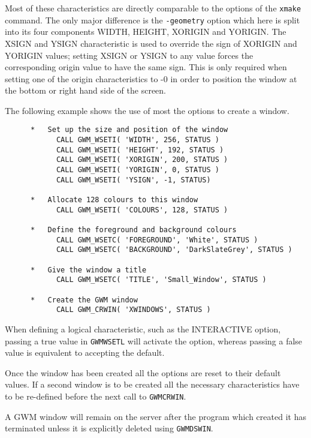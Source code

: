 \documentclass[twoside,11pt]{article}
\newcommand{\htmlref}[2]{#1}
\renewcommand{\_}{\texttt{\symbol{95}}}
\begin{document}
Most of these characteristics are directly comparable to the options
of the {\tt xmake} command. The only major difference is the
\texttt{\htmlref{-geometry}{geometryOpt}}
option which here is split into its four components WIDTH, HEIGHT, XORIGIN
and YORIGIN. The XSIGN and YSIGN characteristic is used to override the sign of
XORIGIN and YORIGIN values; setting XSIGN or YSIGN
to any value forces the corresponding origin value to have the same
sign. This is only required when setting one of the
origin characteristics to -0 in order to position the window at the
bottom or right hand side of the screen.

The following example shows the use of most the options to create a window.

\begin{small}
\begin{verbatim}
      *   Set up the size and position of the window
            CALL GWM_WSETI( 'WIDTH', 256, STATUS )
            CALL GWM_WSETI( 'HEIGHT', 192, STATUS )
            CALL GWM_WSETI( 'XORIGIN', 200, STATUS )
            CALL GWM_WSETI( 'YORIGIN', 0, STATUS )
            CALL GWM_WSETI( 'YSIGN', -1, STATUS)

      *   Allocate 128 colours to this window
            CALL GWM_WSETI( 'COLOURS', 128, STATUS )

      *   Define the foreground and background colours
            CALL GWM_WSETC( 'FOREGROUND', 'White', STATUS )
            CALL GWM_WSETC( 'BACKGROUND', 'DarkSlateGrey', STATUS )

      *   Give the window a title
            CALL GWM_WSETC( 'TITLE', 'Small_Window', STATUS )

      *   Create the GWM window
            CALL GWM_CRWIN( 'XWINDOWS', STATUS )
\end{verbatim}
\end{small}

When defining a logical characteristic, such as the INTERACTIVE option,
passing a true value in \texttt{\htmlref{GWM\_WSETL}{GWM_WSETL}}
will activate the option,
whereas passing a false value is equivalent to accepting the default.

Once the window has been created all the options are reset to their
default values. If a second window is to be created all the necessary
characteristics have to be re-defined before the next call to
{\tt GWM\_CRWIN}.

A GWM window will remain on the server after the program which created
it has terminated unless it is explicitly deleted using
\texttt{\htmlref{GWM\_DSWIN}{GWM_DSWIN}}.
\end{document}
